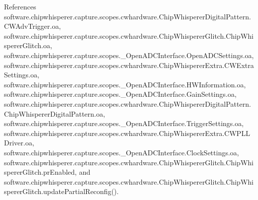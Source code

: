 References software.\+chipwhisperer.\+capture.\+scopes.\+cwhardware.\+Chip\+Whisperer\+Digital\+Pattern.\+C\+W\+Adv\+Trigger.\+oa, software.\+chipwhisperer.\+capture.\+scopes.\+cwhardware.\+Chip\+Whisperer\+Glitch.\+Chip\+Whisperer\+Glitch.\+oa, software.\+chipwhisperer.\+capture.\+scopes.\+\_\+\+Open\+A\+D\+C\+Interface.\+Open\+A\+D\+C\+Settings.\+oa, software.\+chipwhisperer.\+capture.\+scopes.\+cwhardware.\+Chip\+Whisperer\+Extra.\+C\+W\+Extra\+Settings.\+oa, software.\+chipwhisperer.\+capture.\+scopes.\+\_\+\+Open\+A\+D\+C\+Interface.\+H\+W\+Information.\+oa, software.\+chipwhisperer.\+capture.\+scopes.\+\_\+\+Open\+A\+D\+C\+Interface.\+Gain\+Settings.\+oa, software.\+chipwhisperer.\+capture.\+scopes.\+cwhardware.\+Chip\+Whisperer\+Digital\+Pattern.\+Chip\+Whisperer\+Digital\+Pattern.\+oa, software.\+chipwhisperer.\+capture.\+scopes.\+\_\+\+Open\+A\+D\+C\+Interface.\+Trigger\+Settings.\+oa, software.\+chipwhisperer.\+capture.\+scopes.\+cwhardware.\+Chip\+Whisperer\+Extra.\+C\+W\+P\+L\+L\+Driver.\+oa, software.\+chipwhisperer.\+capture.\+scopes.\+\_\+\+Open\+A\+D\+C\+Interface.\+Clock\+Settings.\+oa, software.\+chipwhisperer.\+capture.\+scopes.\+cwhardware.\+Chip\+Whisperer\+Glitch.\+Chip\+Whisperer\+Glitch.\+pr\+Enabled, and software.\+chipwhisperer.\+capture.\+scopes.\+cwhardware.\+Chip\+Whisperer\+Glitch.\+Chip\+Whisperer\+Glitch.\+update\+Partial\+Reconfig().


